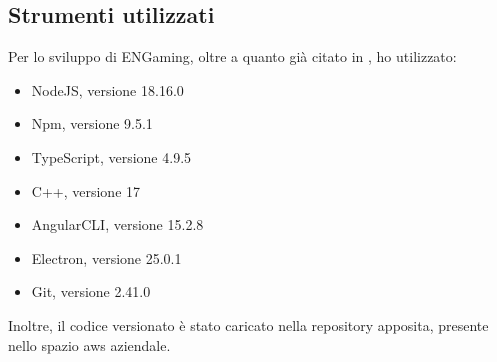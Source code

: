 \subsection{Strumenti utilizzati}
Per lo sviluppo di ENGaming, oltre a quanto già citato in , ho utilizzato:

\begin{itemize}
    \item NodeJS, versione 18.16.0
    \item Npm, versione 9.5.1
    \item TypeScript, versione 4.9.5
    \item C++, versione 17
    \item AngularCLI, versione 15.2.8
    \item Electron, versione 25.0.1
    \item Git, versione 2.41.0
\end{itemize}
Inoltre, il codice versionato è stato caricato nella repository apposita, presente nello spazio \gls{aws} aziendale.
